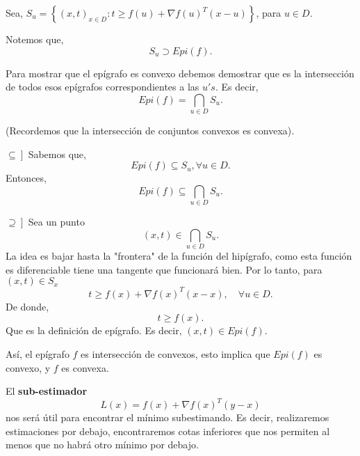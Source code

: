 \begin{paracol}{2}
\begin{teo}
{\begin{center}
	\end{center}
    }
    \switchcolumn[0]\noindent

    Sea, $S_u=\left\{(x,t)_{x\in D}: t\geq f(u)+\nabla f(u)^T(x-u)\right\}$, para $u\in D$. 

    Notemos que,
    $$S_u \supset Epi(f).$$

    Para mostrar que el epígrafo es convexo debemos demostrar que es la intersección de todos esos epígrafos correspondientes a las $u's$. Es decir,
    $$Epi(f)=\bigcap_{u\in D}S_u.$$

    (Recordemos que la intersección de conjuntos convexos es convexa).

    $\left.\subseteq\right]$ Sabemos que,
    $$Epi(f)\subseteq S_u, \forall u\in D.$$
    Entonces, 
    $$Epi(f)\subseteq \bigcap_{u\in D}S_u.$$

    $\left.\supseteq\right]$ Sea un punto 
    $$(x,t)\in \bigcap_{u\in D}S_u.$$
    La idea es bajar hasta la "frontera" de la función del hipígrafo, como esta función es diferenciable tiene una tangente que funcionará bien. Por lo tanto, para $(x,t)\in S_x$
    $$t\geq f(x)+\nabla f(x)^T(x-x), \quad \forall u\in D.$$
    De donde,
    $$t\geq f(x).$$
    Que es la definición de epígrafo. Es decir, $(x,t)\in Epi(f)$. 

    Así, el epígrafo $f$ es intersección de convexos, esto implica que $Epi(f)$ es convexo, y $f$ es convexa.
\end{teo}

El \textbf{sub-estimador} 
$$L(x)=f(x)+\nabla f(x)^T(y-x)$$
nos será útil para encontrar el mínimo subestimando. Es decir, realizaremos estimaciones por debajo, encontraremos cotas inferiores que nos permiten al menos que no habrá otro mínimo por debajo.


\end{paracol}
